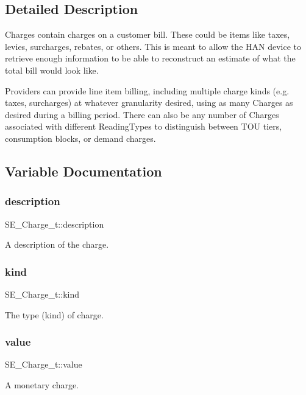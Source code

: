 \subsection{Detailed Description}
Charges contain charges on a customer bill. These could be items like taxes, levies, surcharges, rebates, or others. This is meant to allow the H\+AN device to retrieve enough information to be able to reconstruct an estimate of what the total bill would look like.

Providers can provide line item billing, including multiple charge kinds (e.\+g. taxes, surcharges) at whatever granularity desired, using as many Charges as desired during a billing period. There can also be any number of Charges associated with different Reading\+Types to distinguish between T\+OU tiers, consumption blocks, or demand charges. 

\subsection{Variable Documentation}
\mbox{\label{group__Charge_gaf71b9ce21de6c7acc90259e2ead7523b}} 
\subsubsection{\texorpdfstring{description}{description}}
{\footnotesize\ttfamily S\+E\+\_\+\+Charge\+\_\+t\+::description}

A description of the charge. \mbox{\label{group__Charge_gaa4b5e0563a6399b45d450cd7140d6404}} 
\subsubsection{\texorpdfstring{kind}{kind}}
{\footnotesize\ttfamily S\+E\+\_\+\+Charge\+\_\+t\+::kind}

The type (kind) of charge. \mbox{\label{group__Charge_gaeaac7d57d7b8c24acd4edd955b84f618}} 
\subsubsection{\texorpdfstring{value}{value}}
{\footnotesize\ttfamily S\+E\+\_\+\+Charge\+\_\+t\+::value}

A monetary charge. 